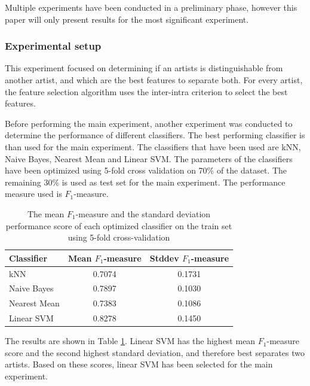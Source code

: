 Multiple experiments have been conducted in a preliminary phase, however this paper will only present results for the most significant experiment.

\subsubsection{Experimental setup}

This experiment focused on determining if an artists is distinguishable from another artist, and which are the best features to separate both. 
For every artist, the feature selection algorithm uses the inter-intra criterion to select the best features.%

Before performing the main experiment, another experiment was conducted to determine the performance of different classifiers.
The best performing classifier is than used for the main experiment.
The classifiers that have been used are kNN, Naive Bayes, Nearest Mean and Linear SVM.
The parameters of the classifiers have been optimized using 5-fold cross validation on 70\% of the dataset.
The remaining 30\% is used as test set for the main experiment. 
The performance measure used is $F_1$-measure.

\begin{table}[htb]
    \centering
    \begin{tabular}
        { | l | c | c |} 
        \hline
        Classifier & Mean $F_1$-measure & Stddev $F_1$-measure  \\
        \hline
        kNN & 0.7074 & 0.1731 \\ 
        Naive Bayes & 0.7897 & 0.1030 \\ 
        Nearest Mean & 0.7383 & 0.1086 \\ 
        Linear SVM & 0.8278 & 0.1450 \\ 
        \hline 
    \end{tabular}
    \caption{The mean $F_1$-measure and the standard deviation performance score of each optimized classifier on the train set using 5-fold cross-validation}
    \label{ex2optimizeresults}
\end{table}

The results are shown in Table \ref{ex2optimizeresults}.
Linear SVM has the highest mean $F_1$-measure score and the second highest standard deviation, and therefore best separates two artists.
Based on these scores, linear SVM has been selected for the main experiment.

